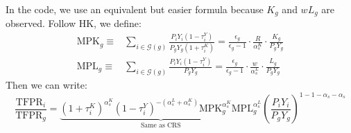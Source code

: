 \documentclass[12pt]{article}
\begin{document}
In the code, we use an equivalent but easier formula because $K_g$ and $wL_g$ are observed. Follow HK, we define:
\begin{align*}
\text{MPK}_g \equiv &\sum_{i \in \mathcal{G}(g)}\frac{P_iY_i(1-\tau_i^Y)}{P_gY_g(1+\tau_i^K)}=\frac{\epsilon_g}{\epsilon_g-1}\cdot \frac{R}{\alpha^K_s} \cdot \frac{K_g}{P_gY_g}\\
\text{MPL}_g \equiv &\sum_{i \in \mathcal{G}(g)}\frac{P_iY_i(1-\tau_i^Y)}{P_gY_g}=\frac{\epsilon_g}{\epsilon_g-1}\cdot \frac{w}{\alpha^L_s} \cdot \frac{L_g}{P_gY_g}
\end{align*}
Then we can write:
$$\frac{\text{TFPR}_i}{\text{TFPR}_g}=\underbrace{ (1+\tau_i^K)^{\alpha^K_s}(1-\tau_i^Y)^{-(\alpha^L_s+\alpha_s^K)}\text{MPK}_g^{\alpha^K_s}\text{MPL}_g^{\alpha^L_s} }_{\text{Same as CRS}} \left( \frac{P_iY_i}{P_gY_g} \right)^{1-1-\alpha_s-\alpha_s} $$
\end{document}
